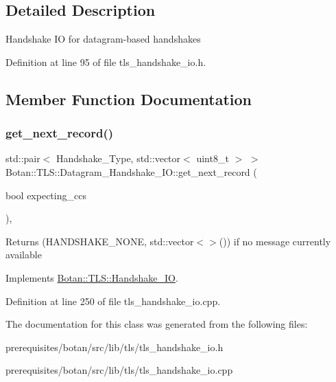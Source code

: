 \subsection{Detailed Description}
Handshake IO for datagram-\/based handshakes 

Definition at line 95 of file tls\+\_\+handshake\+\_\+io.\+h.



\subsection{Member Function Documentation}
\mbox{\label{class_botan_1_1_t_l_s_1_1_datagram___handshake___i_o_a70dbb457e3ba6ae8d43522c4e6db3c3b}} 
\subsubsection{\texorpdfstring{get\+\_\+next\+\_\+record()}{get\_next\_record()}}
{\footnotesize\ttfamily std\+::pair$<$ Handshake\+\_\+\+Type, std\+::vector$<$ uint8\+\_\+t $>$ $>$ Botan\+::\+T\+L\+S\+::\+Datagram\+\_\+\+Handshake\+\_\+\+I\+O\+::get\+\_\+next\+\_\+record (\begin{DoxyParamCaption}\item[{bool}]{expecting\+\_\+ccs }\end{DoxyParamCaption})\hspace{0.3cm}{\ttfamily [override]}, {\ttfamily [virtual]}}

Returns (H\+A\+N\+D\+S\+H\+A\+K\+E\+\_\+\+N\+O\+NE, std\+::vector$<$$>$()) if no message currently available 

Implements \mbox{\hyperlink{class_botan_1_1_t_l_s_1_1_handshake___i_o_a3ebecdb050cb44831453dda8498373a8}{Botan\+::\+T\+L\+S\+::\+Handshake\+\_\+\+IO}}.



Definition at line 250 of file tls\+\_\+handshake\+\_\+io.\+cpp.



The documentation for this class was generated from the following files\+:\begin{DoxyCompactItemize}
\item 
prerequisites/botan/src/lib/tls/tls\+\_\+handshake\+\_\+io.\+h\item 
prerequisites/botan/src/lib/tls/tls\+\_\+handshake\+\_\+io.\+cpp\end{DoxyCompactItemize}
